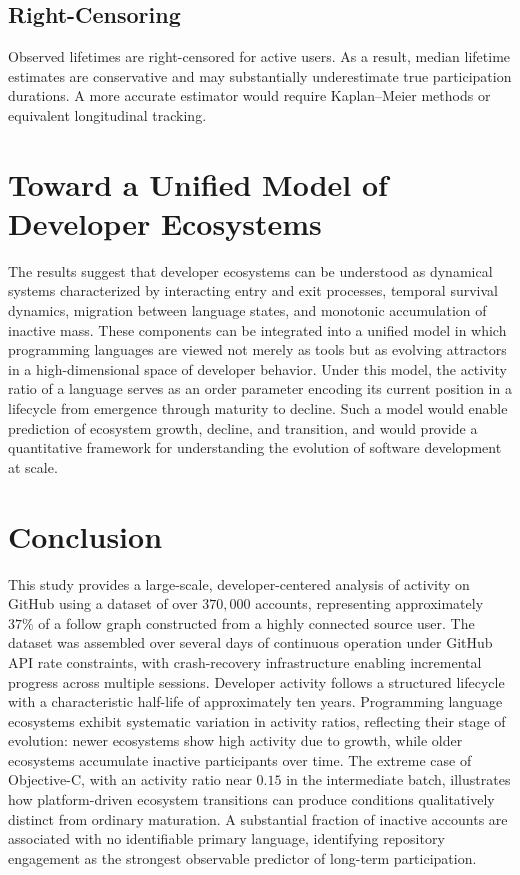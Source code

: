 \documentclass[12pt,a4paper]{article}
\begin{document}
\subsection{Right-Censoring}

Observed lifetimes are right-censored for active users. As a result, median lifetime estimates are conservative and may substantially underestimate true participation durations. A more accurate estimator would require Kaplan--Meier methods or equivalent longitudinal tracking.

\section{Toward a Unified Model of Developer Ecosystems}

The results suggest that developer ecosystems can be understood as dynamical systems characterized by interacting entry and exit processes, temporal survival dynamics, migration between language states, and monotonic accumulation of inactive mass. These components can be integrated into a unified model in which programming languages are viewed not merely as tools but as evolving attractors in a high-dimensional space of developer behavior. Under this model, the activity ratio of a language serves as an order parameter encoding its current position in a lifecycle from emergence through maturity to decline. Such a model would enable prediction of ecosystem growth, decline, and transition, and would provide a quantitative framework for understanding the evolution of software development at scale.

\section{Conclusion}

This study provides a large-scale, developer-centered analysis of activity on GitHub using a dataset of over $370{,}000$ accounts, representing approximately $37\%$ of a follow graph constructed from a highly connected source user. The dataset was assembled over several days of continuous operation under GitHub API rate constraints, with crash-recovery infrastructure enabling incremental progress across multiple sessions. Developer activity follows a structured lifecycle with a characteristic half-life of approximately ten years. Programming language ecosystems exhibit systematic variation in activity ratios, reflecting their stage of evolution: newer ecosystems show high activity due to growth, while older ecosystems accumulate inactive participants over time. The extreme case of Objective-C, with an activity ratio near $0.15$ in the intermediate batch, illustrates how platform-driven ecosystem transitions can produce conditions qualitatively distinct from ordinary maturation. A substantial fraction of inactive accounts are associated with no identifiable primary language, identifying repository engagement as the strongest observable predictor of long-term participation.
\end{document}
